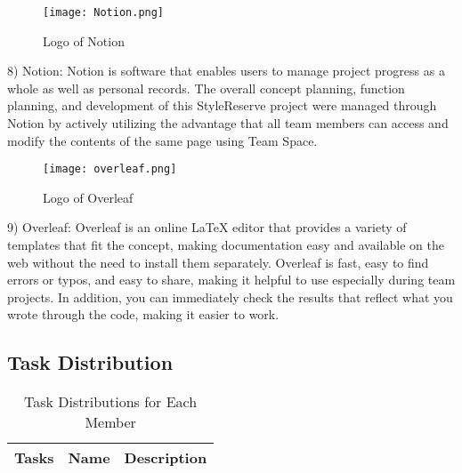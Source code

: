 \documentclass[conference]{IEEEtran}
\begin{document}
\begin{figure}[htbp]
\centerline{\texttt{[image: Notion.png]}}
\label{fig}
\caption{Logo of Notion}
\end{figure}
8) Notion: Notion is software that enables users to manage project progress as a whole as well as personal records. The overall concept planning, function planning, and development of this StyleReserve project were managed through Notion by actively utilizing the advantage that all team members can access and modify the contents of the same page using Team Space.\\

\begin{figure}[htbp]
\centerline{\texttt{[image: overleaf.png]}}
\label{fig}
\caption{Logo of Overleaf}
\end{figure}
9) Overleaf: Overleaf is an online LaTeX editor that provides a variety of templates that fit the concept, making documentation easy and available on the web without the need to install them separately. Overleaf is fast, easy to find errors or typos, and easy to share, making it helpful to use especially during team projects. In addition, you can immediately check the results that reflect what you wrote through the code, making it easier to work.\\

\subsection{Task Distribution}
\begin{table}[htbp]
\caption{Task Distributions for Each Member}
\begin{tabular}{| p{1cm}|p{1.5cm}|p{5.2cm} |}

\hline
Tasks & Name & Description\\

\hline
\end{tabular}
\end{table}
\end{document}
